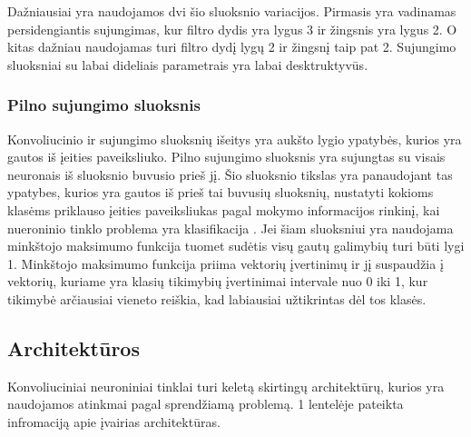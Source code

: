 \documentclass{VUMIFPSkursinis}
\begin{document}
Dažniausiai yra naudojamos dvi šio sluoksnio variacijos. Pirmasis yra vadinamas persidengiantis sujungimas, kur filtro dydis yra lygus 3 ir žingsnis yra lygus 2. 
O kitas dažniau naudojamas turi filtro dydį lygų 2 ir žingsnį taip pat 2. Sujungimo sluoksniai su labai dideliais parametrais yra labai desktruktyvūs.

\subsubsection{Pilno sujungimo sluoksnis}
Konvoliucinio ir sujungimo sluoksnių išeitys yra aukšto lygio ypatybės, kurios yra gautos iš įeities paveiksliuko. Pilno sujungimo sluoksnis yra sujungtas su visais 
neuronais iš sluoksnio buvusio prieš jį. Šio sluoksnio tikslas yra panaudojant tas ypatybes, kurios yra gautos iš prieš tai buvusių sluoksnių, nustatyti kokioms 
klasėms priklauso įeities paveiksliukas pagal mokymo informacijos rinkinį, kai nueroninio tinklo problema yra klasifikacija \cite{layers-fullyconnected}. Jei šiam sluoksniui yra naudojama 
minkštojo maksimumo funkcija tuomet sudėtis visų gautų galimybių turi būti lygi 1. Minkštojo maksimumo funkcija priima vektorių įvertinimų ir jį suspaudžia į 
vektorių, kuriame yra klasių tikimybių įvertinimai intervale nuo 0 iki 1, kur tikimybė arčiausiai vieneto reiškia, kad labiausiai užtikrintas dėl tos klasės.

\subsection{Architektūros}
Konvoliuciniai neuroniniai tinklai turi keletą skirtingų architektūrų, kurios yra naudojamos atinkmai pagal sprendžiamą problemą. 1 lentelėje pateikta infromaciją 
apie įvairias architektūras.
\end{document}
